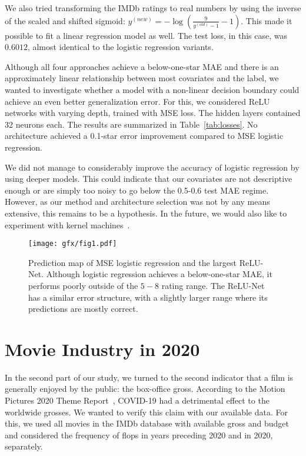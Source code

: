 \documentclass{article}
\begin{document}
We also tried transforming the IMDb ratings to real numbers by using the inverse of the scaled and shifted sigmoid: $y^{(new)} = -\log\left(\frac{9}{y^{(old)} - 1} - 1\right)$. This made it possible to fit a linear regression model as well. The test loss, in this case, was $0.6012$, almost identical to the logistic regression variants.

Although all four approaches achieve a below-one-star MAE and there is an approximately linear relationship between most covariates and the label, we wanted to investigate whether a model with a non-linear decision boundary could achieve an even better generalization error. For this, we considered ReLU networks with varying depth, trained with MSE loss. The hidden layers contained 32 neurons each. The results are summarized in Table~\ref{tab:losses}. No architecture achieved a 0.1-star error improvement compared to MSE logistic regression.

We did not manage to considerably improve the accuracy of logistic regression by using deeper models. This could indicate that our covariates are not descriptive enough or are simply too noisy to go below the 0.5-0.6 test MAE regime. However, as our method and architecture selection was not by any means extensive, this remains to be a hypothesis. In the future, we would also like to experiment with kernel machines~\cite{10.1214/009053607000000677}.

\begin{figure}
    \begin{center}
        \texttt{[image: gfx/fig1.pdf]}
    \end{center}
    \caption{Prediction map of MSE logistic regression and the largest ReLU-Net. Although logistic regression achieves a below-one-star MAE, it performs poorly outside of the $5-8$ rating range. The ReLU-Net has a similar error structure, with a slightly larger range where its predictions are mostly correct.}
\end{figure}

\section{Movie Industry in 2020}
In the second part of our study, we turned to the second indicator that a film is generally enjoyed by the public: the box-office gross. According to the Motion Pictures 2020 Theme Report~\cite{mp2020}, COVID-19 had a detrimental effect to the worldwide grosses. We wanted to verify this claim with our available data. For this, we used all movies in the IMDb database with available gross and budget and considered the frequency of flops in years preceding 2020 and in 2020, separately.
\end{document}
